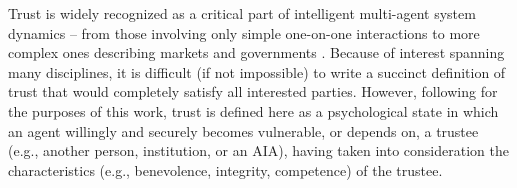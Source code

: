 
    Trust is widely recognized as a critical part of %
    intelligent multi-agent system dynamics -- from those involving only simple one-on-one interactions \cite{Lewicki2006-hj} to more complex ones describing markets and governments \cite{Fukuyama1995-un}. 
    Because of interest spanning many disciplines, it is difficult (if not impossible) to write a succinct definition of trust that would completely satisfy all interested parties. 
    However, following \cite{McKnight2004-vv} for the purposes of this work, trust is defined here as a psychological state in which an agent willingly and securely becomes vulnerable, or depends on, a trustee (e.g., another person, institution, or an AIA), having taken into consideration the characteristics (e.g., benevolence, integrity, competence) of the trustee. 

